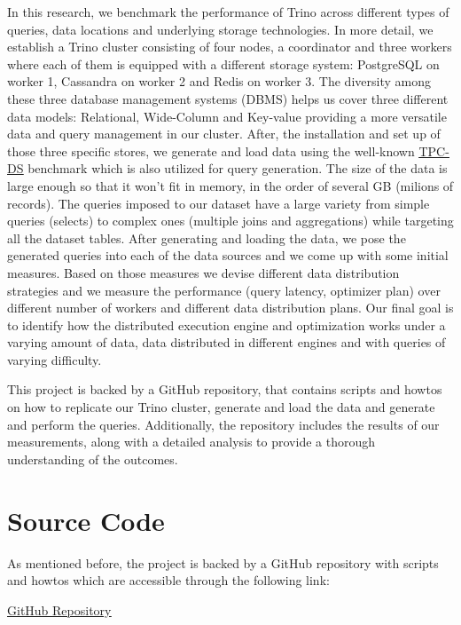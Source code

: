 \documentclass[conference]{IEEEtran}
\begin{document}
In this research, we benchmark the performance of Trino across different types of queries, data locations and underlying
storage technologies. In more detail, we establish a Trino cluster consisting of four nodes, a coordinator and three workers 
where each of them is equipped with a different storage system: PostgreSQL on worker 1, Cassandra on worker 2 and Redis on worker 3. 
The diversity among these three database management systems (DBMS) helps us cover three different data models: 
Relational, Wide-Column and Key-value providing a more versatile data and query management in our cluster. After, the installation and set up of those three specific stores, we generate and load
data using the well-known \textcolor{linkblue}{\underline{\href{https://www.tpc.org/tpcds/}{TPC-DS}}} benchmark which is also utilized for query generation.
The size of the data is large enough so that it won't fit in memory, in the order of several GB (milions of records). 
The queries imposed to our dataset have a large variety from simple queries (selects) to complex ones (multiple joins and aggregations) while targeting all the dataset tables.
After generating and loading the data, we pose the generated queries into each of the data sources and we come up with some
initial measures. Based on those measures we devise different data distribution strategies and we measure the performance
(query latency, optimizer plan) over different number of workers and different data distribution plans. Our final goal is to
identify how the distributed execution engine and optimization works under a varying amount of data, data distributed in
different engines and with queries of varying difficulty. 

This project is backed by a GitHub repository, that contains scripts and howtos on how to replicate our Trino cluster, generate and load the data and 
generate and perform the queries. Additionally, the repository includes the results of our measurements, along with a detailed analysis to provide a 
thorough understanding of the outcomes.



\section{Source Code}
As mentioned before, the project is backed by a GitHub repository with scripts and howtos which are accessible
through the following link:

\begin{center}
\textcolor{linkblue}{\underline{\href{https://github.com/alex1on/Information-Systems-NTUA}{GitHub Repository}}}
\end{center}
\end{document}
